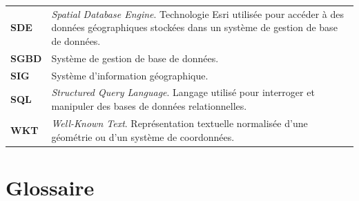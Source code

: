 \begin{longtable}{
    @{}
    >{\bfseries}p{}
    p{}
    @{}
}
SDE
&
\textit{Spatial Database Engine}. Technologie Esri utilisée pour accéder à des
données géographiques stockées dans un système de gestion de base de données.
\\

SGBD
&
Système de gestion de base de données.
\\

SIG
&
Système d'information géographique.
\\

SQL
&
\textit{Structured Query Language}. Langage utilisé pour interroger et
manipuler des bases de données relationnelles.
\\

WKT
&
\textit{Well-Known Text}. Représentation textuelle normalisée d'une géométrie
ou d'un système de coordonnées.
\\

\end{longtable}

\normalsize

\vspace{0.6cm}


\section*{Glossaire}
{}

\small

